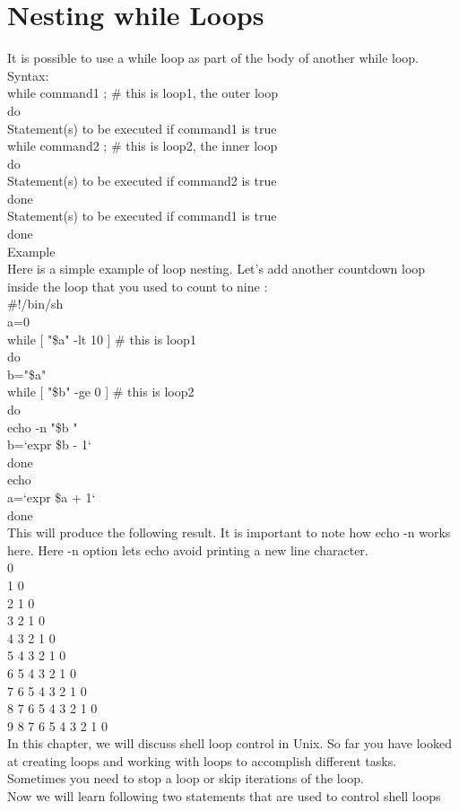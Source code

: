 \documentclass{article}
\begin{document}
\section*{Nesting while Loops}
It is possible to use a while loop as part of the body of another while loop.\\
Syntax:\\
while command1 ; \# this is loop1, the outer loop\\
do\\
   Statement(s) to be executed if command1 is true\\
   while command2 ; \# this is loop2, the inner loop\\
   do\\
      Statement(s) to be executed if command2 is true\\
   done\\
   Statement(s) to be executed if command1 is true\\
done\\
Example\\
Here is a simple example of loop nesting. Let's add another countdown loop inside the loop that you used to count to nine :\\
\#!/bin/sh\\
a=0\\
while [ "\$a" -lt 10 ]    \# this is loop1\\
do\\
   b="\$a"\\
   while [ "\$b" -ge 0 ]  \# this is loop2\\
   do\\
      echo -n "\$b "\\
      b=`expr \$b - 1`\\
   done\\
   echo\\
   a=`expr \$a + 1`\\
done\\
This will produce the following result. It is important to note how echo -n works here. Here -n option lets echo avoid printing a new line character.\\
0\\
1 0\\
2 1 0\\
3 2 1 0\\
4 3 2 1 0\\
5 4 3 2 1 0\\
6 5 4 3 2 1 0\\
7 6 5 4 3 2 1 0\\
8 7 6 5 4 3 2 1 0\\
9 8 7 6 5 4 3 2 1 0\\
In this chapter, we will discuss shell loop control in Unix. So far you have looked at creating loops and working with loops to accomplish different tasks. Sometimes you need to stop a loop or skip iterations of the loop.\\
Now we will learn following two statements that are used to control shell loops
\end{document}
